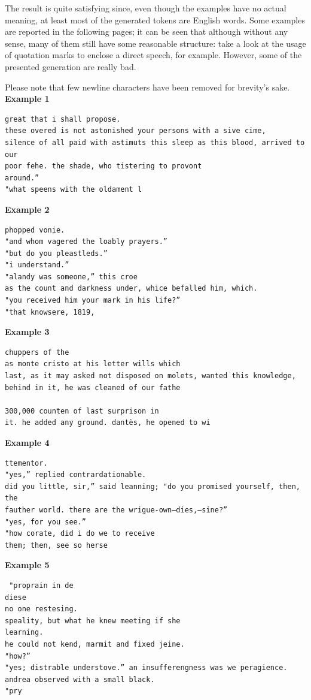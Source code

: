 \documentclass[12pt]{article}
\begin{document}
The result is quite satisfying since, even though the examples have no actual meaning, at least most of the generated tokens are English words. Some examples are reported in the following pages; it can be seen that although without any sense, many of them still have some reasonable structure: take a look at the usage of quotation marks to enclose a direct speech, for example. However, some of the presented generation are really bad.

Please note that few newline characters have been removed for brevity's sake. 
\\

\textbf{Example 1}
\begin{verbatim}
great that i shall propose.
these overed is not astonished your persons with a sive cime,
silence of all paid with astimuts this sleep as this blood, arrived to our
poor fehe. the shade, who tistering to provont
around.”
"what speens with the oldament l
\end{verbatim}

\textbf{Example 2}
\begin{verbatim}
phopped vonie.
"and whom vagered the loably prayers.”
"but do you pleastleds.”
"i understand.”
"alandy was someone,” this croe
as the count and darkness under, whice befalled him, which.
"you received him your mark in his life?”
"that knowsere, 1819,
\end{verbatim}

\textbf{Example 3}
\begin{verbatim}
chuppers of the 
as monte cristo at his letter wills which
last, as it may asked not disposed on molets, wanted this knowledge, 
behind in it, he was cleaned of our fathe

300,000 counten of last surprison in
it. he added any ground. dantès, he opened to wi
\end{verbatim}

\textbf{Example 4}
\begin{verbatim}
ttementor.
"yes,” replied contrardationable.
did you little, sir,” said leanning; "do you promised yourself, then, the
fauther world. there are the wrigue-own—dies,—sine?”
"yes, for you see.”
"how corate, did i do we to receive
them; then, see so herse
\end{verbatim}

\textbf{Example 5}
\begin{verbatim}
 "proprain in de
diese
no one restesing.
speality, but what he knew meeting if she
learning.
he could not kend, marmit and fixed jeine.
"how?”
"yes; distrable understove.” an insufferengness was we peragience. 
andrea observed with a small black.
"pry 
\end{verbatim}
\end{document}
